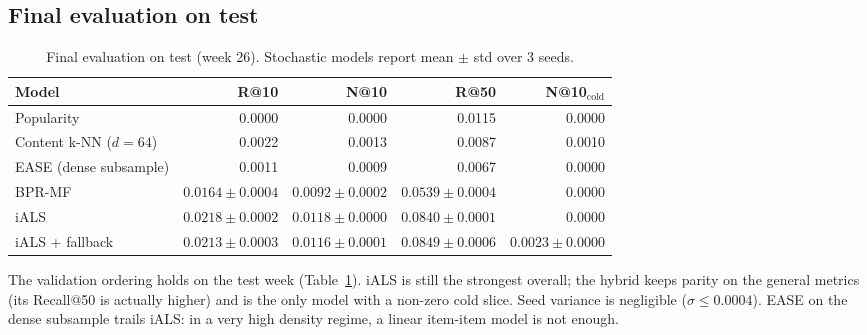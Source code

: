 \documentclass[11pt,a4paper]{article}
\begin{document}
\subsection{Final evaluation on test}
\begin{table}[H]
\centering
\small
\caption{Final evaluation on test (week 26). Stochastic models report mean $\pm$ std over 3 seeds.}
\label{tab:test}
\begin{tabular}{lrrrr}
\toprule
Model & R@10 & N@10 & R@50 & N@10$_{\text{cold}}$ \\
\midrule
Popularity              & 0.0000 & 0.0000 & 0.0115 & 0.0000 \\
Content k-NN ($d{=}64$) & 0.0022 & 0.0013 & 0.0087 & 0.0010 \\
EASE (dense subsample)  & 0.0011 & 0.0009 & 0.0067 & 0.0000 \\
BPR-MF                  & $0.0164 \pm 0.0004$ & $0.0092 \pm 0.0002$ & $0.0539 \pm 0.0004$ & $0.0000$ \\
iALS                    & $\mathbf{0.0218 \pm 0.0002}$ & $\mathbf{0.0118 \pm 0.0000}$ & $0.0840 \pm 0.0001$ & $0.0000$ \\
iALS + fallback         & $0.0213 \pm 0.0003$ & $0.0116 \pm 0.0001$ & $\mathbf{0.0849 \pm 0.0006}$ & $\mathbf{0.0023 \pm 0.0000}$ \\
\bottomrule
\end{tabular}
\end{table}

The validation ordering holds on the test week (Table~\ref{tab:test}). iALS is still the
strongest overall; the hybrid keeps parity on the general metrics (its Recall@50 is
actually higher) and is the only model with a non-zero cold slice. Seed variance is
negligible ($\sigma \leq 0.0004$). EASE on the dense subsample trails iALS: in a
very high density regime, a linear item-item model is not enough.
\end{document}
